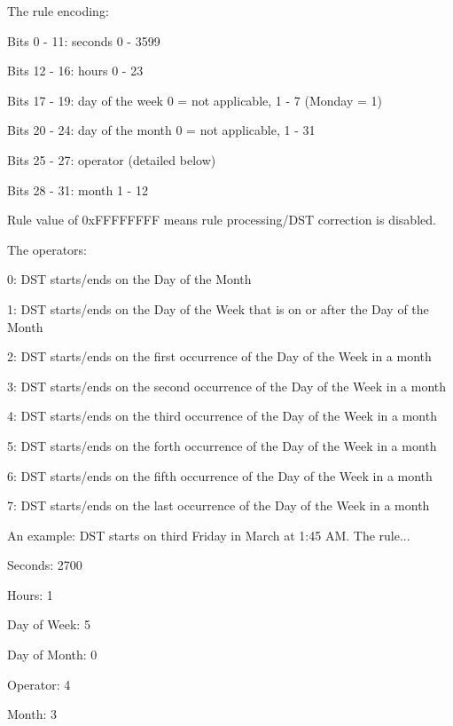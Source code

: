 The rule encoding\+:

Bits 0 -\/ 11\+: seconds 0 -\/ 3599

Bits 12 -\/ 16\+: hours 0 -\/ 23

Bits 17 -\/ 19\+: day of the week 0 = not applicable, 1 -\/ 7 (Monday = 1)

Bits 20 -\/ 24\+: day of the month 0 = not applicable, 1 -\/ 31

Bits 25 -\/ 27\+: operator (detailed below)

Bits 28 -\/ 31\+: month 1 -\/ 12

Rule value of 0x\+F\+F\+F\+F\+F\+F\+FF means rule processing/\+D\+ST correction is disabled.

The operators\+:

0\+: D\+ST starts/ends on the Day of the Month

1\+: D\+ST starts/ends on the Day of the Week that is on or after the Day of the Month

2\+: D\+ST starts/ends on the first occurrence of the Day of the Week in a month

3\+: D\+ST starts/ends on the second occurrence of the Day of the Week in a month

4\+: D\+ST starts/ends on the third occurrence of the Day of the Week in a month

5\+: D\+ST starts/ends on the forth occurrence of the Day of the Week in a month

6\+: D\+ST starts/ends on the fifth occurrence of the Day of the Week in a month

7\+: D\+ST starts/ends on the last occurrence of the Day of the Week in a month

An example\+: D\+ST starts on third Friday in March at 1\+:45 AM. The rule...

Seconds\+: 2700

Hours\+: 1

Day of Week\+: 5

Day of Month\+: 0

Operator\+: 4

Month\+: 3 
